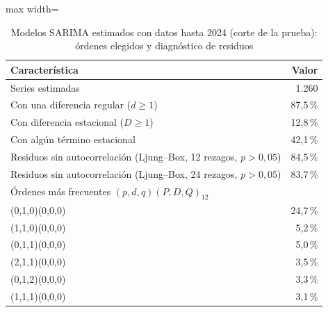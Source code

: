 \begin{table}[htbp]\centering\small
\caption{Modelos SARIMA estimados con datos hasta 2024 (corte de la prueba): órdenes elegidos y diagnóstico de residuos}\label{tab:sarima}
\begin{adjustbox}{max width=\textwidth}\begin{tabular}{lr}\toprule
Característica & Valor\\ \midrule
Series estimadas & 1.260 \\
Con una diferencia regular ($d\ge1$) & 87{,}5\,\% \\
Con diferencia estacional ($D\ge1$) & 12{,}8\,\% \\
Con algún término estacional & 42{,}1\,\% \\
Residuos sin autocorrelación (Ljung--Box, 12 rezagos, $p>0{,}05$) & 84{,}5\,\% \\
Residuos sin autocorrelación (Ljung--Box, 24 rezagos, $p>0{,}05$) & 83{,}7\,\% \\
\midrule
\multicolumn{2}{l}{Órdenes más frecuentes $(p,d,q)(P,D,Q)_{12}$} \\
\quad (0,1,0)(0,0,0) & 24{,}7\,\% \\
\quad (1,1,0)(0,0,0) & 5{,}2\,\% \\
\quad (0,1,1)(0,0,0) & 5{,}0\,\% \\
\quad (2,1,1)(0,0,0) & 3{,}5\,\% \\
\quad (0,1,2)(0,0,0) & 3{,}3\,\% \\
\quad (1,1,1)(0,0,0) & 3{,}1\,\% \\
\bottomrule\end{tabular}\end{adjustbox}\end{table}

